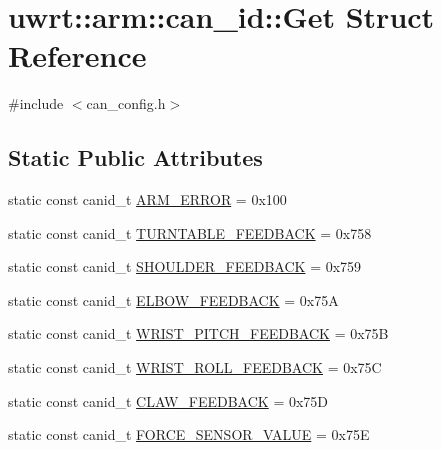 \hypertarget{structuwrt_1_1arm_1_1can__id_1_1_get}{}\section{uwrt\+:\+:arm\+:\+:can\+\_\+id\+:\+:Get Struct Reference}
\label{structuwrt_1_1arm_1_1can__id_1_1_get}


{\ttfamily \#include $<$can\+\_\+config.\+h$>$}

\subsection*{Static Public Attributes}
\begin{DoxyCompactItemize}
\item 
static const canid\+\_\+t \hyperlink{structuwrt_1_1arm_1_1can__id_1_1_get_ac1c7b8f0e61fb15707187ec7413f3c16}{A\+R\+M\+\_\+\+E\+R\+R\+OR} = 0x100
\item 
static const canid\+\_\+t \hyperlink{structuwrt_1_1arm_1_1can__id_1_1_get_a48b3f0857a911585ea517a984cf1ae57}{T\+U\+R\+N\+T\+A\+B\+L\+E\+\_\+\+F\+E\+E\+D\+B\+A\+CK} = 0x758
\item 
static const canid\+\_\+t \hyperlink{structuwrt_1_1arm_1_1can__id_1_1_get_abf59392acead218b613b7f96033d6cc3}{S\+H\+O\+U\+L\+D\+E\+R\+\_\+\+F\+E\+E\+D\+B\+A\+CK} = 0x759
\item 
static const canid\+\_\+t \hyperlink{structuwrt_1_1arm_1_1can__id_1_1_get_aca504ea48dcf663b7cc12d03b121c0fd}{E\+L\+B\+O\+W\+\_\+\+F\+E\+E\+D\+B\+A\+CK} = 0x75A
\item 
static const canid\+\_\+t \hyperlink{structuwrt_1_1arm_1_1can__id_1_1_get_a9cff80034d39cc8bef41ff8e07eb38de}{W\+R\+I\+S\+T\+\_\+\+P\+I\+T\+C\+H\+\_\+\+F\+E\+E\+D\+B\+A\+CK} = 0x75B
\item 
static const canid\+\_\+t \hyperlink{structuwrt_1_1arm_1_1can__id_1_1_get_a62e8920aac6639c70b18b1953b590865}{W\+R\+I\+S\+T\+\_\+\+R\+O\+L\+L\+\_\+\+F\+E\+E\+D\+B\+A\+CK} = 0x75C
\item 
static const canid\+\_\+t \hyperlink{structuwrt_1_1arm_1_1can__id_1_1_get_a2481035a88034d41e6d8d3f5ce550332}{C\+L\+A\+W\+\_\+\+F\+E\+E\+D\+B\+A\+CK} = 0x75D
\item 
static const canid\+\_\+t \hyperlink{structuwrt_1_1arm_1_1can__id_1_1_get_a0d602e43d7cd1b39d96c98d8ad836966}{F\+O\+R\+C\+E\+\_\+\+S\+E\+N\+S\+O\+R\+\_\+\+V\+A\+L\+UE} = 0x75E
\end{DoxyCompactItemize}


